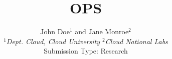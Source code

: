 \documentclass[10pt,twocolumn]{article}
\begin{document}
\title{OPS}
\author{John Doe$^1$ and Jane Monroe$^2$ \\
\small {\em  $^1$Dept. Cloud, Cloud University \quad
          $^2$Cloud National Labs} \\ [2mm]
\small Submission Type: Research
}
\date{}
\maketitle

% 










\end{document}
